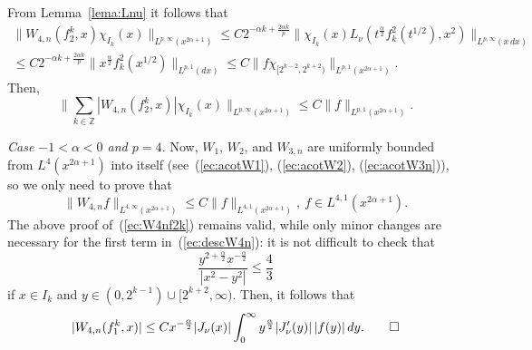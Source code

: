 \documentclass{amsart}
\theoremstyle{plain}
\newcommand{\Z}{\mathbb{Z}}
\begin{document}
From Lemma~\ref{lema:Lnu} it follows that
\begin{align*}
   \|W_{4,n} (f_2^k,x) \chi_{I_k}(x)\|_{L^{p,\infty}(x^{2\alpha+1})}    
   \leq C
   2^{-\alpha k + \frac{2\alpha k}{p}}
   \|  \chi_{I_k}(x) L_\nu(t^\frac{\alpha}{2} f_k^2(t^{1/2}), x^2)
   \|_{L^{p,\infty}(x\, dx)}
   \\
   \leq C
   2^{-\alpha k + \frac{2\alpha k}{p}}
   \| x^\frac{\alpha}{2} f_k^2(x^{1/2}) \|_{L^{p,1}(dx)}
   \leq C \| f \chi_{[2^{k-2},2^{k+2})} \|_{L^{p,1}(x^{2\alpha+1})}.
\end{align*}
Then,
\begin{equation}
\label{ec:W4nf2k}
   \| \sum_{k \in \Z} |W_{4,n} (f_2^k,x)|
   \chi_{I_k}(x)\|_{L^{p,\infty}(x^{2\alpha+1})} 
   \leq C \| f \|_{L^{p,1}(x^{2\alpha+1})}.
\end{equation}

{\it Case $-1 < \alpha < 0$ and $p =4$.} Now, $W_1$, $W_2$, and $W_{3,n}$
are uniformly bounded from $L^4(x^{2\alpha+1})$ into itself
(see~(\ref{ec:acotW1}), (\ref{ec:acotW2}), (\ref{ec:acotW3n})), so we only
need to prove that
\[
   \| W_{4,n} f \|_{L^{4,\infty}(x^{2\alpha+1})}
   \leq C \| f \|_{L^{4,1}(x^{2\alpha+1})},
   \ f \in L^{4,1}(x^{2\alpha+1}).
\]
The above proof of~(\ref{ec:W4nf2k}) remains valid, while only minor
changes are necessary for the first term in~(\ref{ec:descW4n}): it is not
difficult to check that
\[
   \frac{y^{2+\frac{\alpha}{2}} x^{-\frac{\alpha}{2}}}{|x^2-y^2|}
   \leq \frac{4}{3}
\]
if $x \in I_k$ and $y \in (0,2^{k-1}) \cup [2^{k+2},\infty)$. Then, it
follows that
\[
   |W_{4,n} (f_1^k,x)| \leq C x^{-\frac{\alpha}{2}} |J_\nu(x)|
   \int_0^\infty y^{\frac{\alpha}{2}} |J_\nu'(y)| \, |f(y)|
   \,dy.
   \qed
\]


%
\end{document}
